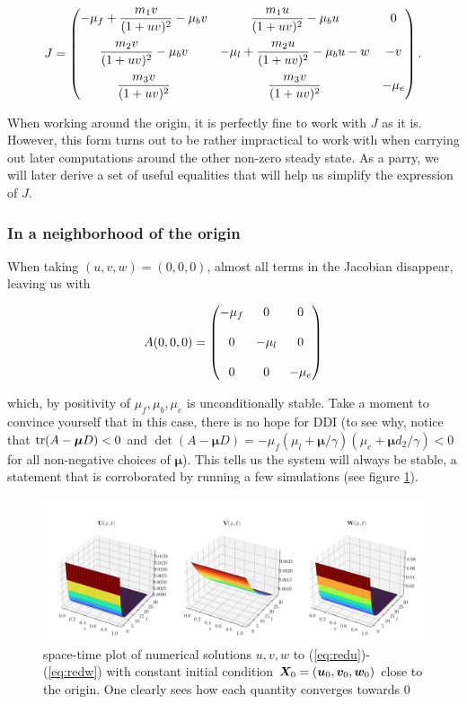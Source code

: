 $$
J = \begin{pmatrix}  -\mu_f +  \dfrac{m_1v}{(1+u v)^2} - \mu_b v &  \dfrac{m_1 u}{(1+u v)^2} - \mu_b u & 0 \\[1.2em]
 \dfrac{m_2 v}{(1+u v)^2} - \mu_b v   & -\mu_l + \dfrac{m_2 u}{(1+u v)^2} - \mu_b u - w  & -v \\[1.2em] 
  \dfrac{m_3 v}{(1+u v)^2} &  \dfrac{m_3 v}{(1+u v)^2} & -\mu_e \end{pmatrix}.
$$

When working around the origin, it is perfectly fine to work with $J$ as it is. However, this form turns out to be rather impractical to work with when carrying out later computations around the other non-zero steady state. As a parry, we will later derive a set of useful equalities that will help us simplify the expression of $J$.

\subsubsection{In a neighborhood of the origin}

When taking $(u, v, w) = (0, 0, 0)$, almost all terms in the Jacobian disappear, leaving us with

$$
A(0, 0, 0) = \begin{pmatrix}  -\mu_f  &  0 & 0 \\[1.2em]
0  & -\mu_l & 0 \\[1.2em] 
0 & 0 & -\mu_e \end{pmatrix}
$$

which, by positivity of $\mu_f, \mu_b, \mu_e$ is unconditionally stable. Take a moment to convince yourself that in this case, there is no hope for DDI (to see why, notice that $\mathrm{tr} (A-\bm\mu D) < 0$ and $\det (A-\bm\mu D) = -\mu_f(\mu_l+ \bm\mu / \gamma)(\mu_e + \bm\mu d_2 / \gamma) < 0$ for all non-negative choices of $\bm\mu$). This tells us the system will always be stable, a statement that is corroborated by running a few simulations (see figure \ref{fig:simulations}).

\begin{figure}
	\centering
	\includegraphics[width=\textwidth]{figures/stable_origin.png}
	\caption{space-time plot of numerical solutions $u, v, w$ to (\ref{eq:redu})-(\ref{eq:redw}) with constant initial condition $\bm X_0 = (\bm{u}_0, \bm{v}_0, \bm{w}_0)$ close to the origin. One clearly sees how each quantity converges towards 0}
	\label{fig:simulations}
\end{figure}

